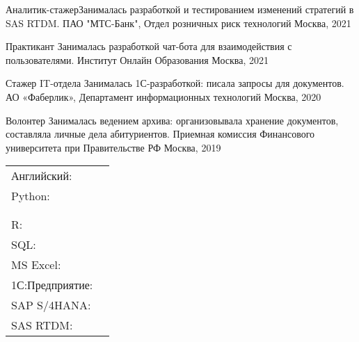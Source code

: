 \documentclass[]{awesome-cv}
\begin{document}
\begin{cventries}
	\cventry
	{Аналитик-стажер\newline \quad \bullet  Занималась разработкой и тестированием изменений стратегий в SAS RTDM.}
	{ПАО "МТС-Банк",  Отдел розничных риск технологий}
	{Москва, 2021}
	{}
	{}
	\end{cventries}  \vspace{-6mm}\begin{cventries}
	\cventry
	{Практикант \newline \quad \bullet  Занималась разработкой чат-бота для взаимодействия с пользователями.}
	{Институт Онлайн Образования}
	{Москва, 2021}
	{}
	{}
	\end{cventries}  \vspace{-6mm}\begin{cventries}
	\cventry
	{Стажер IT-отдела \newline \quad \bullet  Занималась 1С-разработкой: писала запросы для документов.}
	{АО «Фаберлик», Департамент информационных технологий}
	{Москва, 2020}
	{}
	{}
	\end{cventries}  \vspace{-6mm}
	\begin{cventries}
	\cventry
	{Волонтер \newline \quad \bullet  Занималась ведением архива: организовывала хранение документов, составляла личные дела абитуриентов.}
	{Приемная комиссия Финансового университета при Правительстве РФ}
	{Москва, 2019}
	{}
	{}
	\end{cventries}
	\vspace{-7mm}	
	
\vspace{-2mm}
\begin{cventries}
	\cventry
	{}
	{\def\arraystretch{1.15}{\begin{tabular}{ l l }
		Английский: & {\qquad\skill{C1 / Advanced}} \\
		Python:  & {\qquad\skill{Программирую и анализирую данные с помощью pandas,  numpy,  dask,  nltk,  xlwings,  scipy,  seaborn, }} \\
		   & {\qquad\skill{sklearn, PyTorch (библиотеки алгоритмов для анализа, моделирования и обработки данных, }} \\
		   & {\qquad\skill{многомерных массивов,  а также библиотеки машинного обучения и прогноза данных)}} \\
		R:  & {\qquad\skill{Программирую на среднем уровне}} \\
		SQL: & {\qquad\skill{Знаю систему и язык запросов (Microsoft SQL Server)}} \\
		MS Excel: & {\qquad\skill{Могу строить и анализировать финансовые модели}} \\
		1С:Предприятие:& {\qquad\skill{Знаю основные функции системы}} \\
		SAP S/4HANA:& {\qquad\skill{Знаю основные функции и особенности системы}} \\
		SAS RTDM:& {\qquad\skill{Умею разрабатывать и тестировать новые стратегии в системе}} \\
		\end{tabular}}}
	{}
	{}
	{}
\end{cventries}
\end{document}
